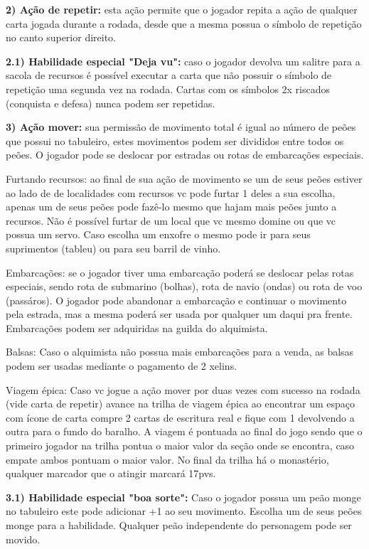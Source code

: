 \documentclass[11pt]{article}
\begin{document}
\textbf{2) Ação de repetir:} esta ação permite que o jogador repita a ação de qualquer carta jogada durante a rodada, desde que a mesma possua o símbolo de repetição no canto superior direito.

\textbf{2.1) Habilidade especial "Deja vu":} caso o jogador devolva um salitre para a sacola de recursos é possível executar a carta que não possuir o símbolo de repetição uma segunda
vez na rodada. Cartas com os símbolos 2x riscados (conquista e defesa) nunca podem ser repetidas.

\textbf{3) Ação mover:} sua permissão de movimento total é igual ao número de peões que possui no tabuleiro, estes movimentos podem ser divididos entre todos os peões. O jogador pode se deslocar
por estradas ou rotas de embarcações especiais.

     Furtando recursos: ao final de sua ação de movimento se um de seus peões estiver ao lado de de localidades com recursos vc pode furtar 1 deles a sua escolha, apenas um de seus peões pode
fazê-lo mesmo que hajam mais peões junto a recursos. Não é possível furtar de um local que vc mesmo domine ou que vc possua um servo.
Caso escolha um enxofre o mesmo pode ir para seus suprimentos (tableu) ou para seu barril de vinho.

     Embarcações: se o jogador tiver uma embarcação poderá se deslocar pelas rotas especiais, sendo rota de submarino (bolhas), rota de navio (ondas) ou rota de voo (passáros). O jogador
pode abandonar a embarcação e continuar o movimento pela estrada, mas a mesma poderá ser usada por qualquer um daqui pra frente. Embarcações podem ser adquiridas na guilda do alquimista.

Balsas: Caso o alquimista não possua mais embarcações para a venda, as balsas podem ser usadas mediante o pagamento de 2 xelins.

     Viagem épica: Caso vc jogue a ação mover por duas vezes com sucesso na rodada (vide carta de repetir) avance na trilha de viagem épica ao encontrar um espaço com ícone de carta
compre 2 cartas de escritura real e fique com 1 devolvendo a outra para o fundo do baralho. A viagem é pontuada ao final do jogo sendo que o primeiro jogador na trilha pontua o maior
valor da seção onde se encontra, caso empate ambos pontuam o maior valor. No final da trilha há o monastério, qualquer marcador que o atingir marcará 17pvs.

\textbf{3.1) Habilidade especial "boa sorte":} Caso o jogador possua um peão monge no tabuleiro este pode adicionar +1 ao seu movimento. Escolha um de seus peões monge para a habilidade.
Qualquer peão independente do personagem pode ser movido.
\end{document}
